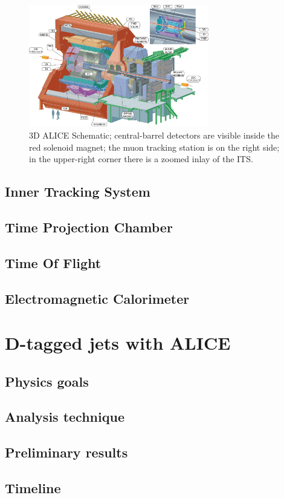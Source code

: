 \documentclass[12pt, a4paper, twoside, titlepage]{article}
\begin{document}
\begin{figure}[tbh]
\begin{center}
\includegraphics[width=0.7\textwidth]{img/alice}
 \caption{3D ALICE Schematic; central-barrel detectors are visible inside the red solenoid magnet;
 the muon tracking station is on the right side; in the upper-right corner there is a zoomed inlay of the ITS.} 
 \label{fig:alice}
\end{center}
\end{figure}

\subsection{Inner Tracking System}
\subsection{Time Projection Chamber}
\subsection{Time Of Flight}
\subsection{Electromagnetic Calorimeter}

\section{D-tagged jets with ALICE}
\subsection{Physics goals}
\subsection{Analysis technique}
\subsection{Preliminary results}
\subsection{Timeline}
{}

\end{document}
